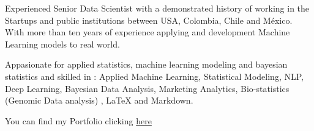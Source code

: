 

\begin{cvparagraph}

Experienced Senior Data Scientist with a demonstrated history of working in the Startups and public institutions between USA, Colombia, Chile and México. With more than ten years of experience applying and development Machine Learning models to real world.

Appasionate for applied statistics, machine learning modeling and bayesian statistics  and skilled in : Applied Machine Learning, Statistical Modeling, NLP, Deep Learning, Bayesian Data Analysis, Marketing Analytics, Bio-statistics (Genomic Data analysis) , LaTeX and Markdown.


You can find my Portfolio clicking \textcolor{red}{\href{https://github.com/carlosjimenez88M/Portfolio/blob/gh-pages/index.md}{here}}
\end{cvparagraph}
